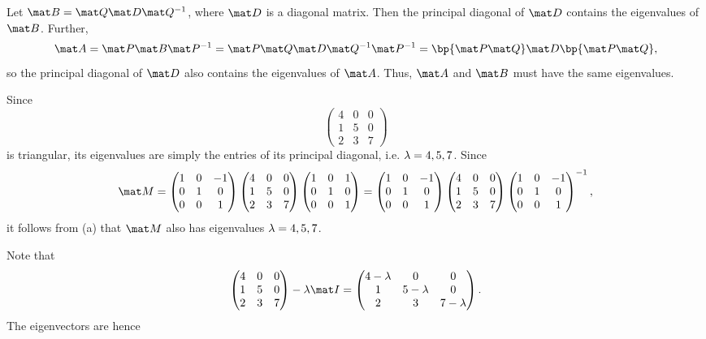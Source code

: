 \begin{solution}
    \begin{ppart}
        Let $\mat B = \mat Q \mat D \mat Q^{-1}$, where $\mat D$ is a diagonal matrix. Then the principal diagonal of $\mat D$ contains the eigenvalues of $\mat B$. Further, \[\mat A = \mat P \mat B \mat P^{-1} = \mat P \mat Q \mat D \mat Q^{-1} \mat P^{-1} = \bp{\mat P \mat Q} \mat D \bp{\mat P \mat Q},\] so the principal diagonal of $\mat D$ also contains the eigenvalues of $\mat A$. Thus, $\mat A$ and $\mat B$ must have the same eigenvalues.
    \end{ppart}
    \begin{ppart}
        Since \[\begin{pmatrix}4 & 0 & 0 \\ 1 & 5 & 0 \\ 2 & 3 & 7\end{pmatrix}\] is triangular, its eigenvalues are simply the entries of its principal diagonal, i.e. $\lambda = 4, 5, 7$. Since \[\mat M = \begin{pmatrix}1 & 0 & -1 \\ 0 & 1 & 0 \\ 0 & 0 & 1\end{pmatrix} \begin{pmatrix}4 & 0 & 0 \\ 1 & 5 & 0 \\ 2 & 3 & 7\end{pmatrix} \begin{pmatrix}1 & 0 & 1 \\ 0 & 1 & 0 \\ 0 & 0 & 1\end{pmatrix} = \begin{pmatrix}1 & 0 & -1 \\ 0 & 1 & 0 \\ 0 & 0 & 1\end{pmatrix} \begin{pmatrix}4 & 0 & 0 \\ 1 & 5 & 0 \\ 2 & 3 & 7\end{pmatrix} \begin{pmatrix}1 & 0 & -1 \\ 0 & 1 & 0 \\ 0 & 0 & 1\end{pmatrix}^{-1},\] it follows from (a) that $\mat M$ also has eigenvalues $\lambda = 4, 5, 7$.
    \end{ppart}
    \begin{ppart}
        Note that \[\begin{pmatrix}4 & 0 & 0 \\ 1 & 5 & 0 \\ 2 & 3 & 7\end{pmatrix} - \l \mat I = \begin{pmatrix}4 - \l & 0 & 0 \\ 1 & 5-\l & 0 \\ 2 & 3 & 7-\l\end{pmatrix}.\] The eigenvectors are hence

\end{ppart}
\end{solution}
